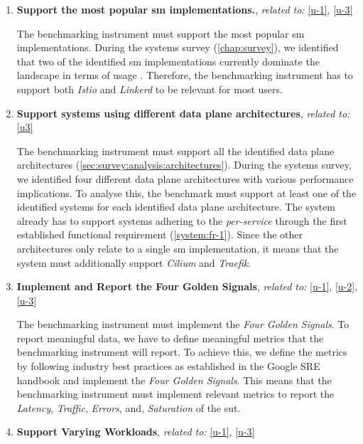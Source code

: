 \begin{enumerate}[label=\textbf{FR\arabic*}, leftmargin=3\parindent]
    \item \textbf{Support the most popular \gls{sm} implementations.}, \textit{related to:} \ref{u-1}, \ref{u-3}
    \label{system:fr-1}
    
    The benchmarking instrument must support the most popular \gls{sm} implementations. During the systems survey (\cref{chap:survey}), we identified that two of the identified \gls{sm} implementations currently dominate the landscape in terms of usage \cite{cncf-survey-2021}. Therefore, the benchmarking instrument has to support both \textit{Istio} and \textit{Linkerd} to be relevant for most users. 
    
    \item \textbf{Support systems using different data plane architectures}, \textit{related to:} \ref{u3}
    \label{system:fr-2}
    
    The benchmarking instrument must support all the identified data plane architectures (\cref{sec:survey:analysis:architectures}). During the systems survey, we identified four different data plane architectures with various performance implications. To analyse this, the benchmark must support at least one of the identified systems for each identified data plane architecture. The system already has to support systems adhering to the \textit{per-service} through the first established functional requirement (\ref{system:fr-1}). Since the other architectures only relate to a single \gls{sm} implementation, it means that the system must additionally support  \textit{Cilium} and \textit{Traefik}.
    
    \item \textbf{Implement and Report the Four Golden Signals}, \textit{related to:} \ref{u-1}, \ref{u-2}, \ref{u-3} 
    \label{system:fr-3}
    
    The benchmarking instrument must implement the \textit{Four Golden Signals}. To report meaningful data, we have to define meaningful metrics that the benchmarking instrument will report. To achieve this, we define the metrics by following industry best practices as established in the Google SRE handbook \cite{google-sre} and implement the \textit{Four Golden Signals}. This means that the benchmarking instrument must implement relevant metrics to report the \textit{Latency}, \textit{Traffic}, \textit{Errors}, and, \textit{Saturation} of the \gls{sut}.
    
    \item \textbf{Support Varying Workloads}, \textit{related to:} \ref{u-1}, \ref{u-3} 
    \label{system:fr-4}
    

\end{enumerate}
